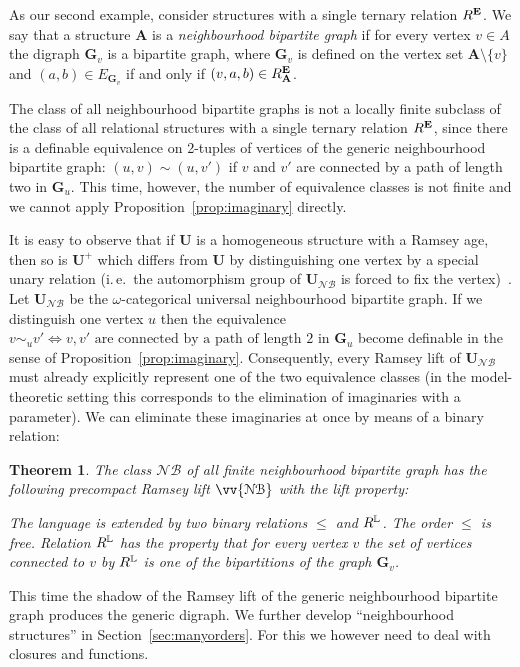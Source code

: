 \documentclass{elsarticle}
\newcommand{\ie}{i.\,e.}
\def\ordclass#1{\vv{#1}}
\def\str#1{\mathbf {#1}}
\def\nbrel#1#2{R\ifstrempty{#1}{}{_{#1}}\ifstrempty{#2}{}{^{#2}}}
\def\rel#1#2{\nbrel{\ifstrempty{#1}{}{\str{#1}}}{#2}}
\theoremstyle{plain}
\newtheorem{theorem}{Theorem}[section]
\theoremstyle{definition}
\theoremstyle{remark}
\begin{document}
As our second example, consider structures with a single ternary relation $\rel{}{\mathbf E}$. We say that a structure $\str{A}$
is a \emph{neighbourhood bipartite graph} if for every vertex $v\in A$ the digraph $\str{G}_v$ is a bipartite graph, where $\str{G}_v$ is defined on the vertex
set $\str{A}\setminus\{v\}$ and $(a,b)\in E_{\str{G}_v}$ if and only if $(v,a,b)\in \rel{A}{\mathbf E}$.

The class of all neighbourhood bipartite graphs is not a locally finite subclass of the class of all relational structures with a single ternary relation $\rel{}{\mathbf E}$, since there is a definable equivalence on 2-tuples of vertices of the generic
neighbourhood bipartite graph: $(u,v)\sim (u,v')$ if $v$ and $v'$ are connected by
a path of length two in $\str{G}_u$.  This time, however, the number of
equivalence classes is not finite and we cannot apply
Proposition~\ref{prop:imaginary} directly.

It is easy to observe that if $\str U$ is a homogeneous structure with a Ramsey age, then so is $\str U^+$ which differs from $\str U$ by distinguishing one vertex by a special unary relation (\ie{}\ the automorphism group of $\str{U}_{\mathcal N\mathcal B}$
is forced to fix the vertex)~\cite{Bodirsky2015}.
Let $\str{U}_{\mathcal N\mathcal B}$ be the $\omega$-categorical universal neighbourhood bipartite graph. If we distinguish one vertex $u$ then the equivalence $v\sim_u v'\iff v,v'\text{ are connected by a path of length 2 in }\str G_u$ become definable in the sense of Proposition~\ref{prop:imaginary}.
Consequently, every Ramsey lift of $\str{U}_{\mathcal N\mathcal B}$ must already explicitly represent one of the two equivalence classes (in the model-theoretic setting this corresponds to the elimination of imaginaries with a parameter). We can eliminate these imaginaries at once by means of a binary relation:

\begin{theorem}
The class $\mathcal N\mathcal B$ of all finite neighbourhood bipartite graph has the following precompact Ramsey lift $\ordclass{\mathcal {NB}}$ with the lift property:

The language is extended by two binary relations $\leq$ and $\rel{}{\mathbb L}$. The order $\leq$ is free. Relation $\rel{}{\mathbb L}$
has the property that for every vertex $v$ the set of vertices connected to $v$ by $\rel{}{\mathbb L}$ is one of the bipartitions of the graph
$\str{G}_v$.
\end{theorem}
This time the shadow of the Ramsey lift of the generic neighbourhood bipartite graph produces the generic digraph.
We further develop ``neighbourhood structures'' in Section~\ref{sec:manyorders}. For this we however need to deal with
closures and functions.
\end{document}
